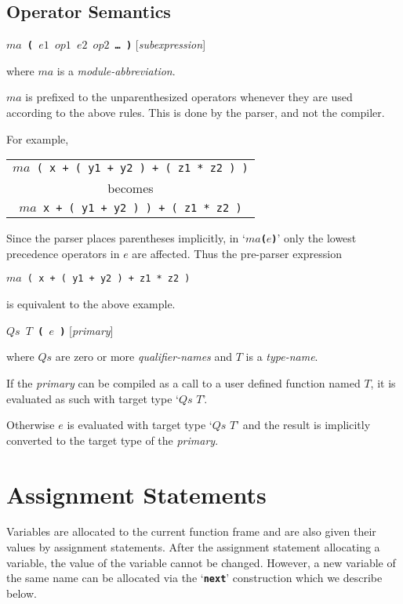 \documentclass[12pt]{article}
\newcommand{\TT}[1]{{\tt \bfseries #1}}
\newenvironment{indpar}[1][0.3in]%
	{\begin{list}{}%
		     {\setlength{\itemsep}{0in}%
		      \setlength{\topsep}{0in}%
		      \setlength{\parsep}{1ex}%
		      \setlength{\labelwidth}{#1}%
		      \setlength{\leftmargin}{#1}%
		      \addtolength{\leftmargin}{\labelsep}}%
	 \item}%
	{\end{list}}
\begin{document}
\subsection{Operator Semantics}

\TT{$ma$ ( $e1$ $op1$ $e2$ $op2$ \ldots{} )}
\hfill [{\em subexpression}]
\label{MODULE-ABBREVIATION-SEMANTICS}
\begin{indpar}
where $ma$ is a {\em module-abbreviation}.

$ma$ is prefixed to the unparenthesized
operators whenever they are used according to the above
rules.  This is done by the parser, and not the compiler.

For example,
\begin{center}
\begin{tabular}{c}
{\tt $ma$ ( x + ( y1 + y2 ) + ( z1 * z2 ) )} \\
becomes \\
{\tt $ma$ x + ( y1 + y2 ) ) + ( z1 * z2 )}
\end{tabular}
\end{center}

Since the parser places parentheses implicitly, in `\TT{$ma$($e$)}'
only the lowest precedence operators in $e$ are affected.
Thus the pre-parser expression
\begin{center}
{\tt $ma$ ( x + ( y1 + y2 ) + z1 * z2 )} \\
\end{center}
is equivalent to the above example.

\end{indpar}

\TT{$Qs$ $T$ ( $e$ )}
\hfill [{\em primary}]
\begin{indpar}
where $Qs$ are zero or more {\em qualifier-names} and $T$ is a {\em type-name}.

If the {\em primary} can be compiled as a call to a
user defined function named $T$, it is evaluated as such with
target type `$Qs$ $T$'.

Otherwise $e$ is evaluated with target type `$Qs$ $T$'
and the result is implicitly
converted to the target type of the {\em primary}.
\end{indpar}

\section{Assignment Statements}
\label{ASSIGNMENT-STATEMENTS}

Variables are allocated to the current function frame
and are also given their values by assignment statements.
After the assignment statement allocating a variable,
the value of the variable cannot be changed.  However,
a new variable of the same name can be allocated via
the `\TT{next}' construction which we describe below.
\end{document}

